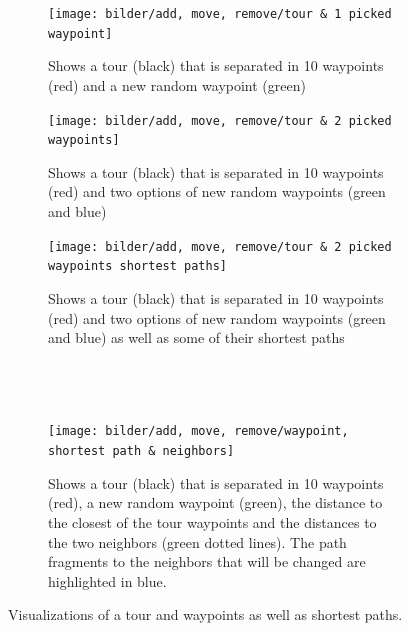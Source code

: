 \begin{figure}[H]
	\begin{subfigure}{0.55\textwidth}
		\texttt{[image: bilder/add, move, remove/tour \& 1 picked waypoint]}
		\caption{Shows a tour (black) that is separated in 10 waypoints (red) and a new random waypoint (green)}
		\label{fig:1WP}
	\end{subfigure}\hfill
	\begin{subfigure}{0.44\textwidth}
	\texttt{[image: bilder/add, move, remove/tour \& 2 picked waypoints]}
	\caption{Shows a tour (black) that is separated in 10 waypoints (red) and two options of new random waypoints (green and blue)}
	\label{fig:2WP}
	\end{subfigure}
	\begin{subfigure}{0.44\textwidth}
	\texttt{[image: bilder/add, move, remove/tour \& 2 picked waypoints shortest paths]}
	\caption{Shows a tour (black) that is separated in 10 waypoints (red) and two options of new random waypoints (green and blue) as well as some of their shortest paths \textcolor{white}{a\\a\\a\\a}}
	\label{fig:2WPandSP}
	\end{subfigure}\hfill
	\begin{subfigure}{0.44\textwidth}
	\texttt{[image: bilder/add, move, remove/waypoint, shortest path \& neighbors]}
	\caption{Shows a tour (black) that is separated in 10 waypoints (red), a new random waypoint (green), the distance to the closest of the tour waypoints and the distances to the two neighbors (green dotted lines). 
		The path fragments to the neighbors that will be changed are highlighted in blue.}
	\label{fig:shortestPathAndneighbors}
	\end{subfigure}
	\caption{Visualizations of a tour and waypoints as well as shortest paths.}
	\label{fig:tourAndWaypointsBase}
\end{figure}


